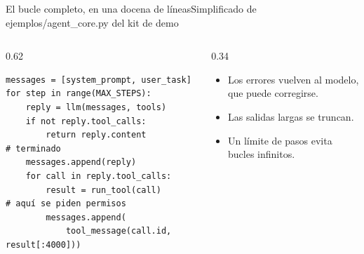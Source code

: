 \begin{frame}[fragile]{El bucle completo, en una docena de líneas}{Simplificado de ejemplos/agent\_core.py del kit de demo}
	\begin{columns}[T]
		\begin{column}{0.62\textwidth}
			\begin{lstlisting}
messages = [system_prompt, user_task]
for step in range(MAX_STEPS):
    reply = llm(messages, tools)
    if not reply.tool_calls:
        return reply.content          # terminado
    messages.append(reply)
    for call in reply.tool_calls:
        result = run_tool(call)       # aquí se piden permisos
        messages.append(
            tool_message(call.id, result[:4000]))
\end{lstlisting}
		\end{column}
		\begin{column}{0.34\textwidth}
			\footnotesize
			\begin{itemize}
				\item Los errores vuelven al modelo, que puede corregirse.
				\item Las salidas largas se truncan.
				\item Un límite de pasos evita bucles infinitos.
			\end{itemize}
		\end{column}
	\end{columns}
\end{frame}

